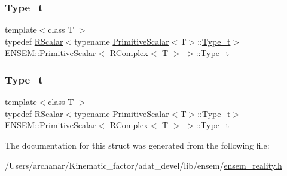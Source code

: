 \subsubsection{\texorpdfstring{Type\_t}{Type\_t}\hspace{0.1cm}{\footnotesize\ttfamily [1/2]}}
{\footnotesize\ttfamily template$<$class T $>$ \\
typedef \mbox{\hyperlink{classENSEM_1_1RScalar}{R\+Scalar}}$<$typename \mbox{\hyperlink{structENSEM_1_1PrimitiveScalar}{Primitive\+Scalar}}$<$T$>$\+::\mbox{\hyperlink{structENSEM_1_1PrimitiveScalar_3_01RComplex_3_01T_01_4_01_4_ad770c97f1555b5a3cd1a0f563d4ba782}{Type\+\_\+t}}$>$ \mbox{\hyperlink{structENSEM_1_1PrimitiveScalar}{E\+N\+S\+E\+M\+::\+Primitive\+Scalar}}$<$ \mbox{\hyperlink{classENSEM_1_1RComplex}{R\+Complex}}$<$ T $>$ $>$\+::\mbox{\hyperlink{structENSEM_1_1PrimitiveScalar_3_01RComplex_3_01T_01_4_01_4_ad770c97f1555b5a3cd1a0f563d4ba782}{Type\+\_\+t}}}

\mbox{\label{structENSEM_1_1PrimitiveScalar_3_01RComplex_3_01T_01_4_01_4_ad770c97f1555b5a3cd1a0f563d4ba782}} 
\subsubsection{\texorpdfstring{Type\_t}{Type\_t}\hspace{0.1cm}{\footnotesize\ttfamily [2/2]}}
{\footnotesize\ttfamily template$<$class T $>$ \\
typedef \mbox{\hyperlink{classENSEM_1_1RScalar}{R\+Scalar}}$<$typename \mbox{\hyperlink{structENSEM_1_1PrimitiveScalar}{Primitive\+Scalar}}$<$T$>$\+::\mbox{\hyperlink{structENSEM_1_1PrimitiveScalar_3_01RComplex_3_01T_01_4_01_4_ad770c97f1555b5a3cd1a0f563d4ba782}{Type\+\_\+t}}$>$ \mbox{\hyperlink{structENSEM_1_1PrimitiveScalar}{E\+N\+S\+E\+M\+::\+Primitive\+Scalar}}$<$ \mbox{\hyperlink{classENSEM_1_1RComplex}{R\+Complex}}$<$ T $>$ $>$\+::\mbox{\hyperlink{structENSEM_1_1PrimitiveScalar_3_01RComplex_3_01T_01_4_01_4_ad770c97f1555b5a3cd1a0f563d4ba782}{Type\+\_\+t}}}



The documentation for this struct was generated from the following file\+:\begin{DoxyCompactItemize}
\item 
/\+Users/archanar/\+Kinematic\+\_\+factor/adat\+\_\+devel/lib/ensem/\mbox{\hyperlink{lib_2ensem_2ensem__reality_8h}{ensem\+\_\+reality.\+h}}\end{DoxyCompactItemize}
